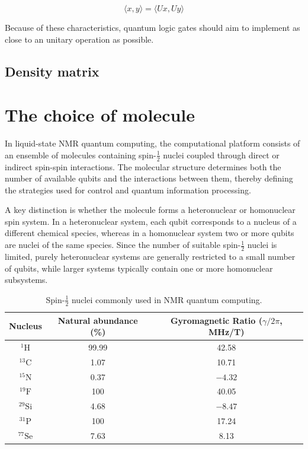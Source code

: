 \begin{equation}
    \langle x,y\rangle=\langle Ux,Uy\rangle
    \label{eq:unitary_norm}
\end{equation}

Because of these characteristics, quantum logic gates should aim to implement as close to an unitary operation as possible.

\subsection{Density matrix}
\label{subsec:density_matrix}

\section{The choice of molecule}
\label{sec:choice_of_molecule}

In liquid-state NMR quantum computing, the computational platform consists of an ensemble of molecules containing spin-\(\frac{1}{2}\) nuclei coupled through direct or indirect spin-spin interactions. The molecular structure determines both the number of available qubits and the interactions between them, thereby defining the strategies used for control and quantum information processing.

A key distinction is whether the molecule forms a heteronuclear or homonuclear spin system. In a heteronuclear system, each qubit corresponds to a nucleus of a different chemical species, whereas in a homonuclear system two or more qubits are nuclei of the same species. Since the number of suitable spin-\(\frac{1}{2}\) nuclei is limited, purely heteronuclear systems are generally restricted to a small number of qubits, while larger systems typically contain one or more homonuclear subsystems.

\begin{table}[ht]
    \centering
    \caption{Spin-$\frac{1}{2}$ nuclei commonly used in NMR quantum computing.}
    \label{tab:spin_half_nuclei}

    \begin{tabular}{ccc}
        \toprule
        \textbf{Nucleus} &
        \textbf{Natural abundance (\%)} &
        \makecell[c]{\textbf{Gyromagnetic Ratio} \\
        (\boldmath$\gamma/2\pi$, \textbf{MHz/T})}\\
        \midrule
        $^{1}\mathrm{H}$   & 99.99 & 42.58 \\
        $^{13}\mathrm{C}$  & 1.07  & 10.71 \\
        $^{15}\mathrm{N}$  & 0.37  & $-4.32$ \\
        $^{19}\mathrm{F}$  & 100   & 40.05 \\
        $^{29}\mathrm{Si}$ & 4.68  & $-8.47$ \\
        $^{31}\mathrm{P}$  & 100   & 17.24 \\
        $^{77}\mathrm{Se}$ & 7.63  & 8.13 \\
        \bottomrule
    \end{tabular}
\end{table}


